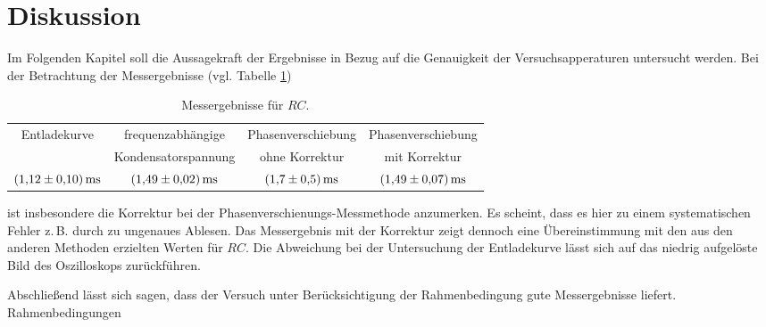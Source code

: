 \section{Diskussion}
Im Folgenden Kapitel soll die Aussagekraft der Ergebnisse in Bezug auf die %
Genauigkeit der Versuchsapperaturen untersucht werden. %
Bei der Betrachtung der Messergebnisse (vgl. Tabelle \ref{tab:messergebnisse})

\begin{table}
  \centering
  \caption{Messergebnisse für $RC$.}
  \label{tab:messergebnisse}
  \begin{tabular}{cccc}
    \toprule
    {Entladekurve} & {frequenzabhängige} & { Phasenverschiebung  } & {Phasenverschiebung} \\
    & { Kondensatorspannung} & {ohne Korrektur} & {mit Korrektur} \\
    \midrule
    $\SI{1.12\pm0.1}{\milli\second} $ & $\SI{1.49\pm0.02}{\milli\second}$ &
    $\SI{1.7\pm0.5}{\milli\second}$ & $\SI{1.49\pm0.07}{\milli\second}$ \\
    \bottomrule
  \end{tabular}
\end{table}

ist insbesondere die Korrektur bei der Phasenverschienungs-Messmethode anzumerken. %
Es scheint, dass es hier zu einem systematischen Fehler z.\,B. durch zu ungenaues Ablesen. %
Das Messergebnis mit der Korrektur zeigt dennoch eine Übereinstimmung mit den
aus den anderen Methoden erzielten Werten für $RC$.
Die Abweichung bei der Untersuchung der Entladekurve lässt sich auf das
niedrig aufgelöste Bild des Oszilloskops zurückführen.

Abschließend lässt sich sagen, dass der Versuch unter Berücksichtigung
der Rahmenbedingung gute Messergebnisse liefert. Rahmenbedingungen
